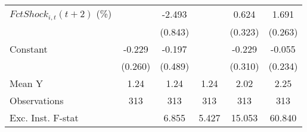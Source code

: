 {\begin{tabular}{l*{5}{c}}
\addlinespace
$ FctShock_{i,t}(t+2)$ (\%)&                     &      -2.493\sym{***}&                     &       0.624\sym{*}  &       1.691\sym{***}\\
                    &                     &     (0.843)         &                     &     (0.323)         &     (0.263)         \\
\addlinespace
Constant            &      -0.229         &      -0.197         &                     &      -0.229         &      -0.055         \\
                    &     (0.260)         &     (0.489)         &                     &     (0.310)         &     (0.234)         \\
\midrule
Mean Y              &        1.24         &        1.24         &        1.24         &        2.02         &        2.25         \\
Observations        &         313         &         313         &         313         &         313         &         313         \\
Exc. Inst. F-stat   &                     &       6.855         &       5.427         &      15.053         &      60.840         \\
\bottomrule
\end{tabular}
}
